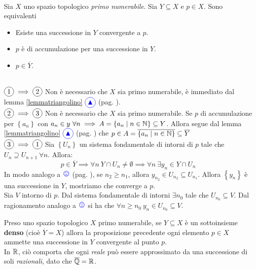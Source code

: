 \begin{proposition}~{}\\
	Sia $X$ uno spazio topologico \textit{primo numerabile}. Sia $Y\subseteq X$ e $p\in X$. Sono equivalenti
	\begin{itemize}
		\item Esiste una successione in $Y$ convergente a $p$.
		\item $p$ è di accumulazione per una successione in $Y$.
		\item $p\in \overline{Y}$.
	\end{itemize}
\vspace{-3mm}
\end{proposition}
\begin{demonstration}~{}\\
$\circled{1}\implies\circled{2}$ Non è necessario che $X$ sia primo numerabile, è immediato dal lemma \ref{lemmatriangolino} $\textcolor{blue}{\circled{{\large \blacktriangle}}}$ (pag. \pageref{lemmatriangolino}).\\
$\circled{2}\implies\circled{3}$ Non è necessario che $X$ sia primo numerabile. Se $p$ di accumulazione per $\left\{a_n\right\}$ con $a_n\in y\ \forall n\implies A=\left\{a_n\mid n\in \mathbb{N}\right\}\subseteq Y$. Allora segue dal lemma \ref{lemmatriangolino} $\textcolor{blue}{\circled{{\large \blacktriangle}}}$ (pag. \pageref{lemmatriangolino}) che $p\in A=\overline{\left\{a_n\mid n\in \mathbb{N}\right\}}\subseteq \overline{Y}$ \\
$\circled{3}\implies\circled{1}$ Sia $\left\{U_n\right\}$ un sistema fondamentale di intorni di $p$ tale che $U_n\supseteq U_{n+1}\ \forall n$. Allora:
\begin{equation*}
	p\in \overline{Y}\implies \forall n\ Y\cap U_n\neq\emptyset\implies\forall n\ \exists y_n\in Y\cap U_n
\end{equation*}
In modo analogo a $\textcolor{blue}{{\large \smiley{}}}$ (pag. \pageref{notasorridente}), se $n_2\geq n_1$, allora $y_{n_2}\in U_{n_2}\subseteq U_{n_1}$. Allora $\left\{y_n\right\}$ è una successione in $Y$, mostriamo che converge a $p$.\\
Sia $V$ intorno di $p$. Dal sistema fondamentale di intorni $\exists n_0$ tale che $U_{n_0}\subseteq V$. Dal ragionamento analogo a $\textcolor{blue}{{\large \smiley{}}}$ si ha che $\forall n\geq n_0\ y_n\in U_{n_0}\subseteq V$.
\end{demonstration}
\begin{observe}\label{densitaesuccessioni}
	Preso uno spazio topologico $X$ primo numerabile, se $Y\subseteq X$ è un sottoinsieme \textbf{denso} (cioè $\overline{Y}=X$) allora la proposizione precedente ogni elemento $p\in X$ ammette una successione in $Y$ convergente al punto $p$.\\
	In $\mathbb{R}$, ciò comporta che ogni \textit{reale} può essere approssimato da una successione di soli \textit{razionali}, dato che $\overline{\mathbb{Q}}=\mathbb{R}$.
\end{observe}
